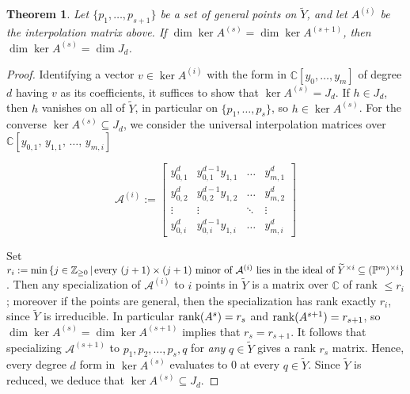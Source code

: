 \documentclass[letter]{amsart}
\newtheorem{theorem}[prop]{Theorem}
\theoremstyle{definition}
\begin{document}
\begin{theorem} \label{hilbertFunctionThm}
Let $\{p_1, \ldots, p_{s+1}\}$ be a set of general points on $\widetilde{Y}$, and let $A^{(i)}$ be the interpolation matrix above. If $\dim \ker A^{(s)} = \dim \ker A^{(s+1)}$, then $\dim \ker A^{(s)} = \dim J_d$.
\end{theorem}
\begin{proof}
Identifying a vector $v \in \ker A^{(i)}$ with the form in ${\mathbb{C}}[y_{0}, \ldots, y_{m}]$ of degree $d$ having $v$ as its coefficients,
it suffices to show that $\ker A^{(s)} = J_d$. 
If $h \in J_d$, then $h$ vanishes on all of $\widetilde{Y}$, in particular on $\{p_1, \ldots, p_s\}$, so $h \in \ker A^{(s)}$. 
For the converse $\ker A^{(s)} \subseteq J_d$, we consider the universal interpolation matrices over ${\mathbb{C}}[y_{0,1}, \, y_{1,1}, \, \ldots, \, y_{m, i}]$

$$\mathcal{A}^{(i)} := \begin{bmatrix} y_{0,1}^{d} & y_{0,1}^{d-1}y_{1,1} & \ldots & y_{m,1}^{d} \\[3pt] 
y_{0,2}^{d} & y_{0,2}^{d-1}y_{1,2} & \ldots & y_{m,2}^{d} \\[3pt]
\vdots & \vdots & \ddots & \vdots \\[3pt]
y_{0,i}^{d} & y_{0,i}^{d-1}y_{1,i} & \ldots & y_{m,i}^{d}
\end{bmatrix}$$

\vspace{0.15cm}
\noindent Set $r_{i} := \min \, \{j \in {\mathbb{Z}}_{\geq 0} \, | \, \textup{every } (j+1) \times (j+1) \textup{ minor of } \mathcal{A}^{(i)} \textup{ lies in the ideal of } \widetilde{Y}^{\times i} \subseteq ({\mathbb{P}}^{m})^{\times i} \}$.
Then any specialization of $\mathcal{A}^{(i)}$ to $i$ points in $\widetilde{Y}$ is a matrix over ${\mathbb{C}}$ of rank $\leq r_i$; moreover if the points are general, then the specialization has rank exactly $r_i$, since $\widetilde{Y}$ is irreducible. In particular $\textup{rank}(A^{s}) = r_s$ and $\textup{rank}(A^{s+1}) = r_{s+1}$, so $\dim \ker A^{(s)} = \dim \ker A^{(s+1)}$ implies that $r_s = r_{s+1}$.  
It follows that specializing $\mathcal{A}^{(s+1)}$ to $p_1, p_2, \ldots, p_s, q$ for \textit{any} $q \in \widetilde{Y}$ gives a rank $r_s$ matrix.  Hence, every degree $d$ form in $\ker A^{(s)}$ evaluates to 0 at every $q \in \widetilde{Y}$.  Since $\widetilde{Y}$ is reduced, we deduce that $\ker A^{(s)} \subseteq J_d$.
\end{proof}
\end{document}
